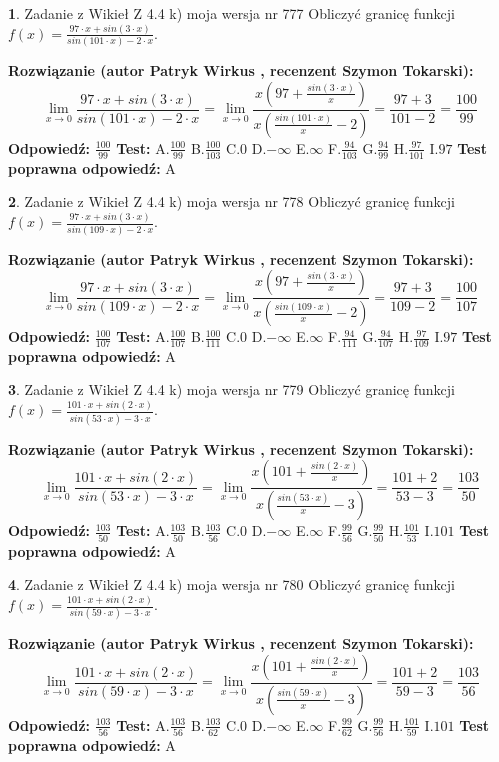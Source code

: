 \documentclass[12pt, a4paper]{article}
\theoremstyle{definition} %
\newtheorem{zad}{}
\newcommand{\zadStart}[1]{\begin{zad}#1\newline}
\newcommand{\zadStop}{\end{zad}}
\newcommand{\rozwStart}[2]{\noindent \textbf{Rozwiązanie (autor #1 , recenzent #2): }\newline}
\newcommand{\rozwStop}{\newline}
\newcommand{\odpStart}{\noindent \textbf{Odpowiedź:}\newline}
\newcommand{\odpStop}{\newline}
\newcommand{\testStart}{\noindent \textbf{Test:}\newline}
\newcommand{\testStop}{\newline}
\newcommand{\kluczStart}{\noindent \textbf{Test poprawna odpowiedź:}\newline}
\newcommand{\kluczStop}{\newline}
\begin{document}
\zadStart{Zadanie z Wikieł Z 4.4 k) moja wersja nr 777}
Obliczyć granicę funkcji $f(x)=\frac{97\cdot x +sin(3\cdot x)}{sin(101\cdot x) -2\cdot x}$.
\zadStop
\rozwStart{Patryk Wirkus}{Szymon Tokarski}
$$\lim\limits_{x\to 0}\frac{97\cdot x +sin(3\cdot x)}{sin(101\cdot x) -2\cdot x}
=\lim\limits_{x\to 0}\frac{x(97+\frac{sin(3\cdot x)}{x})}{x(\frac{sin(101\cdot x)}{x}-2)}
=\frac{97+3}{101-2} = \frac{100}{99}$$
\rozwStop
\odpStart
$\frac{100}{99}$
\odpStop
\testStart
A.$\frac{100}{99}$
B.$\frac{100}{103}$
C.$0$
D.$-\infty$
E.$\infty$
F.$\frac{94}{103}$
G.$\frac{94}{99}$
H.$\frac{97}{101}$
I.$97$
\testStop
\kluczStart
A
\kluczStop



\zadStart{Zadanie z Wikieł Z 4.4 k) moja wersja nr 778}
Obliczyć granicę funkcji $f(x)=\frac{97\cdot x +sin(3\cdot x)}{sin(109\cdot x) -2\cdot x}$.
\zadStop
\rozwStart{Patryk Wirkus}{Szymon Tokarski}
$$\lim\limits_{x\to 0}\frac{97\cdot x +sin(3\cdot x)}{sin(109\cdot x) -2\cdot x}
=\lim\limits_{x\to 0}\frac{x(97+\frac{sin(3\cdot x)}{x})}{x(\frac{sin(109\cdot x)}{x}-2)}
=\frac{97+3}{109-2} = \frac{100}{107}$$
\rozwStop
\odpStart
$\frac{100}{107}$
\odpStop
\testStart
A.$\frac{100}{107}$
B.$\frac{100}{111}$
C.$0$
D.$-\infty$
E.$\infty$
F.$\frac{94}{111}$
G.$\frac{94}{107}$
H.$\frac{97}{109}$
I.$97$
\testStop
\kluczStart
A
\kluczStop



\zadStart{Zadanie z Wikieł Z 4.4 k) moja wersja nr 779}
Obliczyć granicę funkcji $f(x)=\frac{101\cdot x +sin(2\cdot x)}{sin(53\cdot x) -3\cdot x}$.
\zadStop
\rozwStart{Patryk Wirkus}{Szymon Tokarski}
$$\lim\limits_{x\to 0}\frac{101\cdot x +sin(2\cdot x)}{sin(53\cdot x) -3\cdot x}
=\lim\limits_{x\to 0}\frac{x(101+\frac{sin(2\cdot x)}{x})}{x(\frac{sin(53\cdot x)}{x}-3)}
=\frac{101+2}{53-3} = \frac{103}{50}$$
\rozwStop
\odpStart
$\frac{103}{50}$
\odpStop
\testStart
A.$\frac{103}{50}$
B.$\frac{103}{56}$
C.$0$
D.$-\infty$
E.$\infty$
F.$\frac{99}{56}$
G.$\frac{99}{50}$
H.$\frac{101}{53}$
I.$101$
\testStop
\kluczStart
A
\kluczStop



\zadStart{Zadanie z Wikieł Z 4.4 k) moja wersja nr 780}
Obliczyć granicę funkcji $f(x)=\frac{101\cdot x +sin(2\cdot x)}{sin(59\cdot x) -3\cdot x}$.
\zadStop
\rozwStart{Patryk Wirkus}{Szymon Tokarski}
$$\lim\limits_{x\to 0}\frac{101\cdot x +sin(2\cdot x)}{sin(59\cdot x) -3\cdot x}
=\lim\limits_{x\to 0}\frac{x(101+\frac{sin(2\cdot x)}{x})}{x(\frac{sin(59\cdot x)}{x}-3)}
=\frac{101+2}{59-3} = \frac{103}{56}$$
\rozwStop
\odpStart
$\frac{103}{56}$
\odpStop
\testStart
A.$\frac{103}{56}$
B.$\frac{103}{62}$
C.$0$
D.$-\infty$
E.$\infty$
F.$\frac{99}{62}$
G.$\frac{99}{56}$
H.$\frac{101}{59}$
I.$101$
\testStop
\kluczStart
A
\kluczStop
\end{document}
